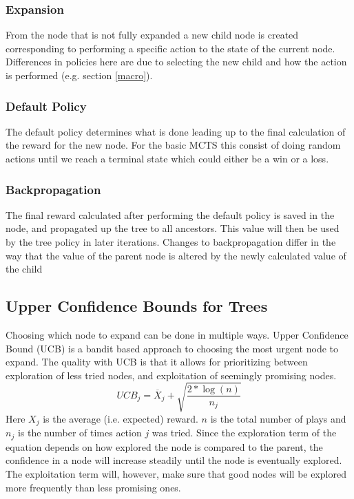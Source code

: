 \documentclass[10pt,a4paper]{article}
\begin{document}
\subsubsection{Expansion}
From the node that is not fully expanded a new child node is created corresponding to performing a specific action to the state of the current node. Differences in policies here are due to selecting the new child and how the action is performed (e.g. section \ref{macro}).
\subsubsection{Default Policy}
The default policy determines what is done leading up to the final calculation of the reward for the new node. For the basic MCTS this consist of doing random actions until we reach a terminal state which could either be a win or a loss.
\subsubsection{Backpropagation}
The final reward calculated after performing the default policy is saved in the node, and propagated up the tree to all ancestors. This value will then be used by the tree policy in later iterations. Changes to backpropagation differ in the way that the value of the parent node is altered by the newly calculated value of the child

\subsection{Upper Confidence Bounds for Trees}
Choosing which node to expand can be done in multiple ways. Upper Confidence Bound (UCB) is a bandit based approach to choosing the most urgent node to expand. The quality with UCB is that it allows for prioritizing between exploration of less tried nodes, and exploitation of seemingly promising nodes.
\begin{equation}
\label{eq:ucb1}
\displaystyle UCB_j = \overline{X}_j + \sqrt{\frac{2 * \log(n)}{n_j}}
\end{equation}
Here $X_j$ is the average (i.e. expected) reward. $n$ is the total number of plays and $n_j$ is the number of times action $j$ was tried. Since the exploration term of the equation depends on how explored the node is compared to the parent, the confidence in a node will increase steadily until the node is eventually explored. The exploitation term will, however, make sure that good nodes will be explored more frequently than less promising ones.
\end{document}
